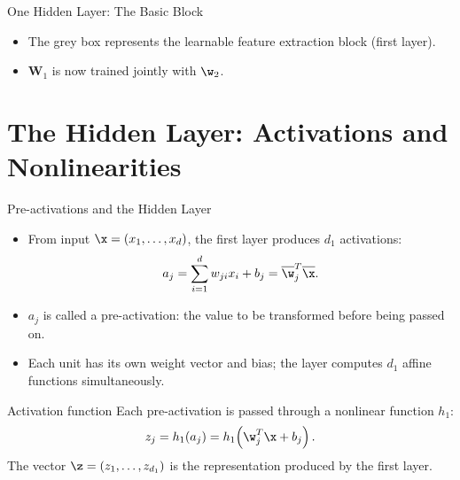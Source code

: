 \begin{frame}{One Hidden Layer: The Basic Block}
\begin{center}
  \end{center}
  \begin{itemize}
    \item The grey box represents the \alert{learnable feature extraction block} (first layer).
    \item $\mathbf{W}_1$ is now trained jointly with $\w_2$.
  \end{itemize}
\end{frame}

\section{The Hidden Layer: Activations and Nonlinearities}

\begin{frame}{Pre-activations and the Hidden Layer}
  \begin{itemize}
    \item From input $\x = (x_1,\ldots,x_d)$, the first layer produces $d_1$ \alert{activations}:
    \[
      a_j = \sum_{i=1}^{d} w_{ji} x_i + b_j = \overline{\w}_j^T \overline{\x}.
    \]
    \item $a_j$ is called a \alert{pre-activation}: the value to be transformed before being passed on.
    \item Each unit has its own weight vector and bias; the layer computes $d_1$ affine functions simultaneously.
  \end{itemize}
  \begin{block}{Activation function}
    Each pre-activation is passed through a nonlinear function $h_1$:
    \[
      z_j = h_1(a_j) = h_1\!\left(\w_j^T\x + b_j\right).
    \]
    The vector $\z = (z_1,\ldots,z_{d_1})$ is the representation produced by the first layer.
  \end{block}
\end{frame}

